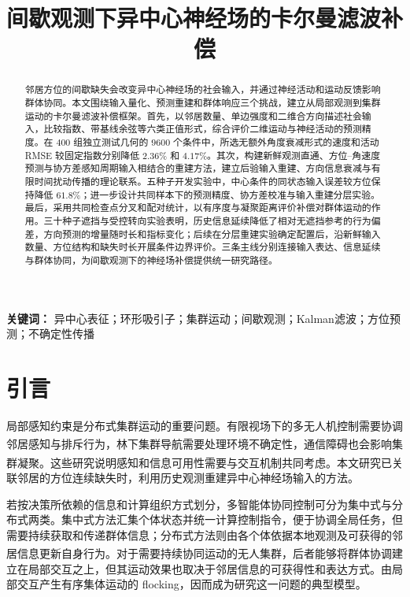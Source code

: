 \documentclass[UTF8,fontset=windows,11pt]{ctexart}
\title{间歇观测下异中心神经场的卡尔曼滤波补偿}
\author{}
\date{}
\makeatletter
\renewcommand{\maketitle}{\begin{center}\vspace*{-1em}{\LARGE\bfseries\noindent\@title\par}\vspace{1em}\end{center}}
\newcommand{\upcite}[1]{\textsuperscript{\cite{#1}}}
\makeatother
\begin{document}
\maketitle

\begin{abstract}
邻居方位的间歇缺失会改变异中心神经场的社会输入，并通过神经活动和运动反馈影响群体协同。本文围绕输入量化、预测重建和群体响应三个挑战，建立从局部观测到集群运动的卡尔曼滤波补偿框架。首先，以邻居数量、单边强度和二维合方向描述社会输入，比较指数、带基线余弦等六类正值形式，综合评价二维运动与神经活动的预测精度。在 $400$ 组独立测试几何的 $9600$ 个条件中，所选无额外角度衰减形式的速度和活动 RMSE 较固定指数分别降低 $2.36\%$ 和 $4.17\%$。其次，构建新鲜观测直通、方位--角速度预测与协方差感知周期输入相结合的重建方法，建立后验输入重建、方向信息衰减与有限时间扰动传播的理论联系。五种子开发实验中，中心条件的同状态输入误差较方位保持降低 $61.8\%$；进一步设计共同样本下的预测精度、协方差校准与输入重建分层实验。最后，采用共同检查点分叉和配对统计，以有序度与凝聚距离评价补偿对群体运动的作用。三十种子遮挡与受控转向实验表明，历史信息延续降低了相对无遮挡参考的行为偏差，方向预测的增量随时长和指标变化；后续在分层重建实验确定配置后，沿新鲜输入数量、方位结构和缺失时长开展条件边界评价。三条主线分别连接输入表达、信息延续与群体协同，为间歇观测下的神经场补偿提供统一研究路径。

\end{abstract}

\noindent\textbf{关键词：} 异中心表征；环形吸引子；集群运动；间歇观测；Kalman滤波；方位预测；不确定性传播

\section{引言}

局部感知约束是分布式集群运动的重要问题。有限视场下的多无人机控制需要协调邻居感知与排斥行为\upcite{Bai2024}，林下集群导航需要处理环境不确定性\upcite{Boldrer2026}，通信障碍也会影响集群凝聚\upcite{LiFlocking2024}。这些研究说明感知和信息可用性需要与交互机制共同考虑。本文研究已关联邻居的方位连续缺失时，利用历史观测重建异中心神经场输入的方法。

若按决策所依赖的信息和计算组织方式划分，多智能体协同控制可分为集中式与分布式两类。集中式方法汇集个体状态并统一计算控制指令，便于协调全局任务，但需要持续获取和传递群体信息；分布式方法则由各个体依据本地观测及可获得的邻居信息更新自身行为\upcite{OlfatiSaber2006}。对于需要持续协同运动的无人集群，后者能够将群体协调建立在局部交互之上，但其运动效果也取决于邻居信息的可获得性和表达方式。由局部交互产生有序集体运动的 flocking，因而成为研究这一问题的典型模型。
\end{document}
